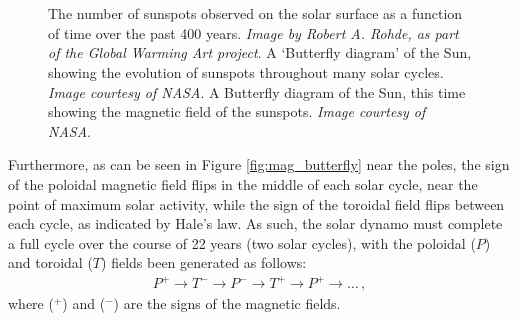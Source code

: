 \documentclass[11pt,a4paper,onecolumn]{report}
\begin{document}
\begin{figure}[t]%
  \centering
  \\%
  \\%
  \caption[]{ The number of sunspots observed on the
  solar surface as a function of time over the past 400 years. \textit{Image by
  Robert A. Rohde, as part of the Global Warming Art project}.
   A `Butterfly diagram' of the Sun, showing the
  evolution of sunspots throughout many solar cycles. \textit{Image courtesy of
  NASA}.  A Butterfly diagram of the Sun, this time
  showing the magnetic field of the sunspots. \textit{Image courtesy of NASA}. }
\end{figure}

Furthermore, as can be seen in Figure \ref{fig:mag_butterfly} near the poles,
the sign of the poloidal magnetic field flips in the middle of each solar cycle,
near the point of maximum solar activity, while the sign of the toroidal field
flips between each cycle, as indicated by Hale's law. As such, the solar dynamo
must complete a full cycle over the course of 22 years (two solar cycles), with the
poloidal (\(P\)) and toroidal (\(T\)) fields been generated as follows:
\begin{align}
  P^+ \rightarrow T^- \rightarrow P^- \rightarrow T^+ \rightarrow P^+ \rightarrow \dotsc\,,
  \label{eqn:dynamo process}
\end{align}
where (\(^+\)) and (\( ^-\)) are the signs of the magnetic fields. \\
\end{document}
